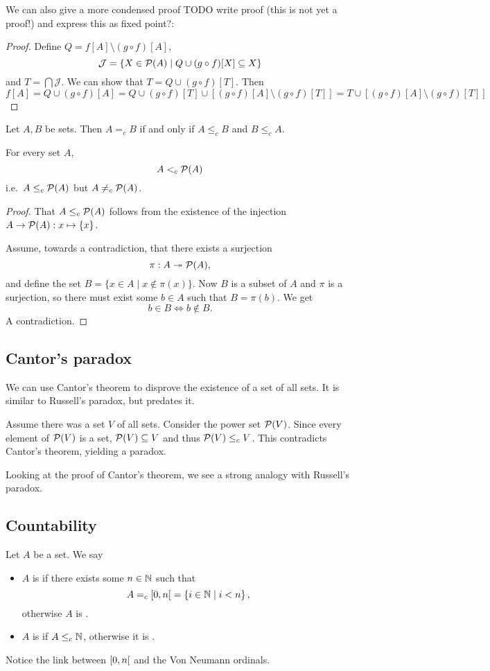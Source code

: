 We can also give a more condensed proof TODO write proof (this is not yet a proof!) and express this as fixed point?:
\begin{proof}
Define $Q = f[A]\setminus (g\circ f)[A]$,
\[ \mathcal{J} = \{ X\in \operatorname{\mathcal{P}}(A)\;|\; Q\cup (g\circ f)[X] \subseteq X \} \]
and $T = \bigcap \mathcal{J}$. We can show that $T = Q\cup (g\circ f)[T]$. Then
\[ f[A] = Q\cup (g\circ f)[A] = Q\cup (g\circ f)[T]\cup [(g\circ f)[A]\setminus (g\circ f)[T]] = T\cup [(g\circ f)[A]\setminus (g\circ f)[T]] \]
\end{proof}
\begin{corollary}
Let $A,B$ be sets. Then $A =_c B$ \textup{if and only if} $A\leq_c B$ and $B\leq_c A$.
\end{corollary}

\begin{theorem} \label{Cantor}
For every set $A$,
\[ A <_c \operatorname{\mathcal{P}}(A) \]
i.e.\ $A\leq_c \operatorname{\mathcal{P}}(A)$ but $A\neq_c \operatorname{\mathcal{P}}(A)$.
\end{theorem}
\begin{proof}
That $A\leq_c \operatorname{\mathcal{P}}(A)$ follows from the existence of the injection $A\to \operatorname{\mathcal{P}}(A): x\mapsto \{x\}$.

Assume, towards a contradiction, that there exists a surjection
\[ \pi: A\twoheadrightarrow \operatorname{\mathcal{P}}(A), \]
and define the set $B = \{x \in A \;|\; x \notin \pi(x)\}$.
Now $B$ is a subset of $A$ and $\pi$ is a surjection, so there must exist some $b \in A$ such that $B = \pi(b)$. We get
\[ b \in B \iff b \notin B. \]
A contradiction.
\end{proof}


\subsection{Cantor's paradox}
We can use Cantor's theorem to disprove the existence of a set of all sets. It is similar to Russell's paradox, but predates it.

Assume there was a set $V$ of all sets. Consider the power set $\operatorname{\mathcal{P}}(V)$. Since every element of $\operatorname{\mathcal{P}}(V)$ is a set, $\operatorname{\mathcal{P}}(V) \subseteq V$ and thus $\operatorname{\mathcal{P}}(V) \leq_c V$. This contradicts Cantor's theorem, yielding a paradox.

Looking at the proof of Cantor's theorem, we see a strong analogy with Russell's paradox.

\subsection{Countability}
\begin{definition}
Let $A$ be a set. We say
\begin{itemize}
\item $A$ is  if there exists some $n\in \mathbb{N}$ such that
\[ A =_c \interval[co]{0, n} = \setbuilder{i\in \N}{i<n}, \]
otherwise $A$ is .
\item $A$ is  if $A\leq_c\mathbb{N}$, otherwise it is .
\end{itemize}
\end{definition}
Notice the link between $\interval[co]{0,n}$ and the Von Neumann ordinals.


